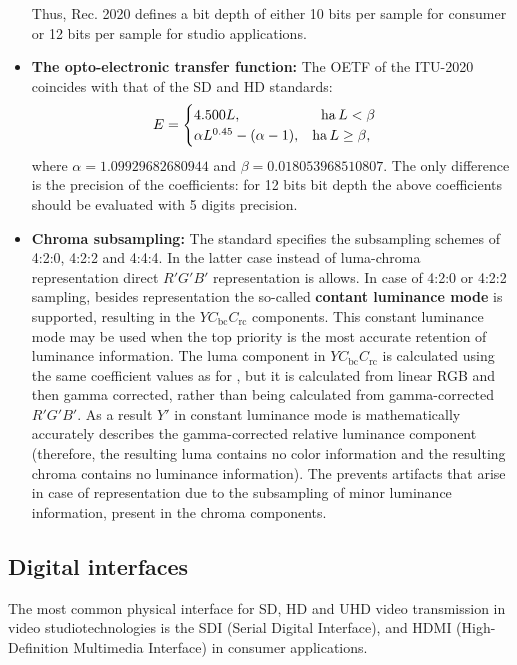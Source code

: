 \begin{itemize}
Thus, Rec. 2020 defines a bit depth of either 10 bits per sample for consumer or 12 bits per sample for studio applications.
\item \textbf{The opto-electronic transfer function:} 
The OETF of the ITU-2020 coincides with that of the SD and HD standards:
\begin{equation}
E = 
\begin{cases}
4.500 L, \hspace{20mm} \mathrm{ha}\, L < \beta \\
\alpha L^{0.45} - (\alpha - 1 ), \hspace{3mm} \mathrm{ha}\, L \geq \beta,
\end{cases}
\end{equation}
where $\alpha = 1.09929682680944$ and $\beta = 0.018053968510807$.
The only difference is the precision of the coefficients: for 12 bits bit depth the above coefficients should be evaluated with 5 digits precision.
%
\item \textbf{Chroma subsampling:} 
The standard specifies the subsampling schemes of 4:2:0, 4:2:2 and 4:4:4.
In the latter case instead of luma-chroma representation direct $R'G'B'$ representation is allows.
In case of 4:2:0 or 4:2:2 sampling, besides \ycbcr representation the so-called \textbf{contant luminance mode} is supported, resulting in the $Y C_{\mathrm{bc}} C_{\mathrm{rc}}$ components.
This constant luminance mode may be used when the top priority is the most accurate retention of luminance information.
The luma component in $Y C_{\mathrm{bc}} C_{\mathrm{rc}}$ is calculated using the same coefficient values as for \ycbcr, but it is calculated from linear RGB and then gamma corrected, rather than being calculated from gamma-corrected $R'G'B'$.
As a result $Y'$ in constant luminance mode is mathematically accurately describes the gamma-corrected relative luminance component (therefore, the resulting luma contains no color information and the resulting chroma contains no luminance information).
The prevents artifacts that arise in case of \ycbcr representation due to the subsampling of minor luminance information, present in the chroma components.
\end{itemize}

\subsection{Digital interfaces}
The most common physical interface for SD, HD and UHD video transmission in video studiotechnologies is the SDI (Serial Digital Interface), and HDMI (High-Definition Multimedia Interface) in consumer applications.

